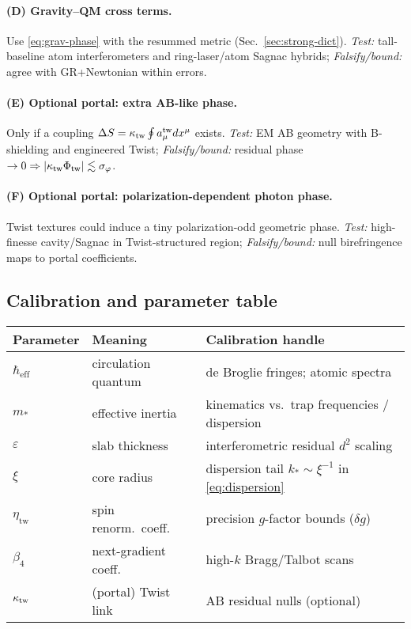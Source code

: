 \paragraph{(D) Gravity--QM cross terms.}
Use \eqref{eq:grav-phase} with the resummed metric (Sec.~\ref{sec:strong-dict}). \emph{Test:} tall-baseline atom interferometers and ring-laser/atom Sagnac hybrids; \emph{Falsify/bound:} agree with GR+Newtonian within errors.

\paragraph{(E) Optional portal: extra AB-like phase.}
Only if a coupling \(\Delta S=\kappa_{\rm tw}\oint a^{\rm tw}_\mu dx^\mu\) exists. \emph{Test:} EM AB geometry with B-shielding and engineered Twist; \emph{Falsify/bound:} residual phase \(\to 0\Rightarrow |\kappa_{\rm tw}\Phi_{\rm tw}| \lesssim \sigma_\varphi\).

\paragraph{(F) Optional portal: polarization-dependent photon phase.}
Twist textures could induce a tiny polarization-odd geometric phase. \emph{Test:} high-finesse cavity/Sagnac in Twist-structured region; \emph{Falsify/bound:} null birefringence maps to portal coefficients.

\subsection{Calibration and parameter table}
\label{sec:QM_calibration}

\begin{center}
\renewcommand{\arraystretch}{1.2}
\begin{tabular}{lll}
\toprule
Parameter & Meaning & Calibration handle \\
\midrule
\(\hbar_{\mathrm{eff}}\) & circulation quantum & de Broglie fringes; atomic spectra \\
\(m_*\) & effective inertia & kinematics vs.\ trap frequencies / dispersion \\
\(\varepsilon\) & slab thickness & interferometric residual \(d^2\) scaling \\
\(\xi\) & core radius & dispersion tail \(k_*\!\sim\!\xi^{-1}\) in \eqref{eq:dispersion} \\
\(\eta_{\mathrm{tw}}\) & spin renorm.\ coeff. & precision \(g\)-factor bounds (\(\delta g\)) \\
\(\beta_4\) & next-gradient coeff. & high-$k$ Bragg/Talbot scans \\
\(\kappa_{\rm tw}\) & (portal) Twist link & AB residual nulls (optional) \\
\bottomrule
\end{tabular}
\end{center}

